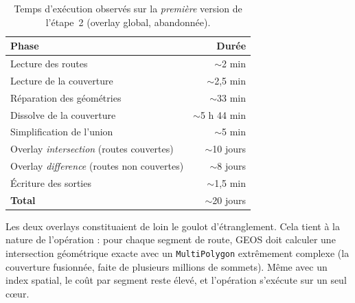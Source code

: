 \documentclass[11pt,a4paper]{article}
\begin{document}
\begin{table}[H]
  \centering
  \caption{Temps d'exécution observés sur la \emph{première} version de l'étape~2 (overlay global, abandonnée).}
  \label{tab:perfs}
  \begin{tabular}{lr}
    \toprule
    \textbf{Phase} & \textbf{Durée} \\
    \midrule
    Lecture des routes                          & $\sim$2 min \\
    Lecture de la couverture                    & $\sim$2{,}5 min \\
    Réparation des géométries                   & $\sim$33 min \\
    Dissolve de la couverture                   & $\sim$5 h 44 min \\
    Simplification de l'union                   & $\sim$5 min \\
    Overlay \emph{intersection} (routes couvertes)     & $\sim$10 jours \\
    Overlay \emph{difference} (routes non couvertes)   & $\sim$8 jours \\
    Écriture des sorties                        & $\sim$1{,}5 min \\
    \midrule
    \textbf{Total}                              & $\sim$20 jours \\
    \bottomrule
  \end{tabular}
\end{table}

Les deux overlays constituaient de loin le goulot d'étranglement. Cela tient à la nature de l'opération : pour chaque segment de route, GEOS doit calculer une intersection géométrique exacte avec un \texttt{MultiPolygon} extrêmement complexe (la couverture fusionnée, faite de plusieurs millions de sommets). Même avec un index spatial, le coût par segment reste élevé, et l'opération s'exécute sur un seul cœur.
\end{document}
